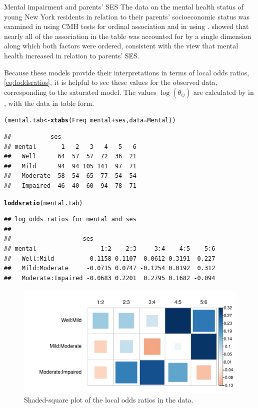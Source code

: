 \documentclass[11pt]{book}\usepackage[]{graphicx}\usepackage[]{color}
\makeatletter
\newcommand{\hlopt}[1]{\textcolor[rgb]{0,0,0}{#1}}%
\newcommand{\hlstd}[1]{\textcolor[rgb]{0.345,0.345,0.345}{#1}}%
\newcommand{\hlkwb}[1]{\textcolor[rgb]{0.69,0.353,0.396}{#1}}%
\newcommand{\hlkwc}[1]{\textcolor[rgb]{0.333,0.667,0.333}{#1}}%
\newcommand{\hlkwd}[1]{\textcolor[rgb]{0.737,0.353,0.396}{\textbf{#1}}}%
\newenvironment{kframe}{%
 \def\at@end@of@kframe{}%
 \ifinner\ifhmode%
  \def\at@end@of@kframe{\end{minipage}}%
  \begin{minipage}{\columnwidth}%
 \fi\fi%
 \def\FrameCommand##1{\hskip\@totalleftmargin \hskip-\fboxsep
 \colorbox{shadecolor}{##1}\hskip-\fboxsep
     \hskip-\linewidth \hskip-\@totalleftmargin \hskip\columnwidth}%
 \MakeFramed {\advance\hsize-\width
   \@totalleftmargin\z@ \linewidth\hsize
   \@setminipage}}%
 {\par\unskip\endMakeFramed%
 \at@end@of@kframe}
\newenvironment{knitrout}{}{} %
\renewenvironment{knitrout}{\small\renewcommand{\baselinestretch}{.85}}{} %
\makeatother
\begin{document}
\begin{Example}[mental4]{Mental impairment and parents' SES}
The  data on the mental health status of young
New York residents in relation to their parents'
socioeconomic status was
examined in  using CMH tests for ordinal
association and in  using \ca.
 showed that nearly all of the association in the
table was accounted for by a single dimension along which both factors
were ordered, consistent with the view that mental health increased
in relation to parents' SES.

Because these models provide their interpretations in terms of local odds
ratios, \eqref{eq:loddsratios},
it is helpful to see these values for the observed data,
corresponding to the saturated model.  The values
$\log(\theta_{ij})$ are calculated by
 in , with the data in table form.
\begin{knitrout}
\color{fgcolor}\begin{kframe}
\begin{alltt}
\hlstd{(mental.tab} \hlkwb{<-} \hlkwd{xtabs}\hlstd{(Freq} \hlopt{~} \hlstd{mental}\hlopt{+}\hlstd{ses,} \hlkwc{data}\hlstd{=Mental))}
\end{alltt}
\begin{verbatim}
##           ses
## mental       1   2   3   4   5   6
##   Well      64  57  57  72  36  21
##   Mild      94  94 105 141  97  71
##   Moderate  58  54  65  77  54  54
##   Impaired  46  40  60  94  78  71
\end{verbatim}
\begin{alltt}
\hlkwd{loddsratio}\hlstd{(mental.tab)}
\end{alltt}
\begin{verbatim}
## log odds ratios for mental and ses 
## 
##                    ses
## mental                  1:2    2:3     3:4    4:5    5:6
##   Well:Mild          0.1158 0.1107  0.0612 0.3191  0.227
##   Mild:Moderate     -0.0715 0.0747 -0.1254 0.0192  0.312
##   Moderate:Impaired -0.0683 0.2201  0.2795 0.1682 -0.094
\end{verbatim}
\end{kframe}
\end{knitrout}

\begin{figure}[!htb]
\centering
\includegraphics[width=.75\textwidth]{ch08/fig/mental-lorplot}
\caption{Shaded-square plot of the local odds ratios in the  data.}
\label{fig:mental-lorplot}
\end{figure}


\end{Example}
\end{document}
